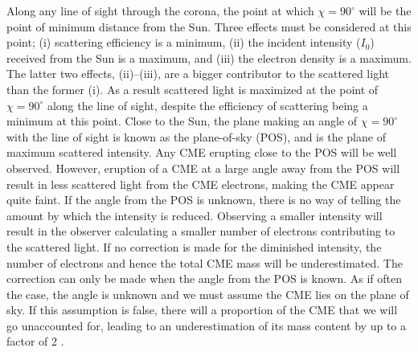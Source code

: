 Along any line of sight through the corona, the point at which $\chi = 90^{\circ}$ will be the point of minimum distance from the Sun. Three effects must be considered at this point; (i) scattering efficiency is a minimum, (ii) the incident intensity ($I_0$) received from the Sun is a maximum, and (iii) the electron density is a maximum. The latter two effects, (ii)--(iii), are a bigger contributor to the scattered light than the former (i). As a result scattered light is maximized at the point of $\chi = 90^{\circ}$ along the line of sight, despite the efficiency of scattering being a minimum at this point. Close to the Sun, the plane making an angle of $\chi = 90^{\circ}$ with the line of sight is known as the plane-of-sky (POS), and is the plane of maximum scattered intensity. Any CME erupting close to the POS will be well observed. However, eruption of a CME at a large angle away from the POS will result in less scattered light from the CME electrons, making the CME appear quite faint. If the angle from the POS is unknown, there is no way of telling the amount by which the intensity is reduced. Observing a smaller intensity will result in the observer calculating a smaller number of electrons contributing to the scattered light. If no correction is made for the diminished intensity, the number of electrons and hence the total CME mass will be underestimated. The correction can only be made when the angle from the POS is known. As if often the case, the angle is unknown and we must assume the CME lies on the plane of sky. If this assumption is false, there will a proportion of the CME that we will go unaccounted for, leading to an underestimation of its mass content by up to a factor of 2 \citep{vou00}.


